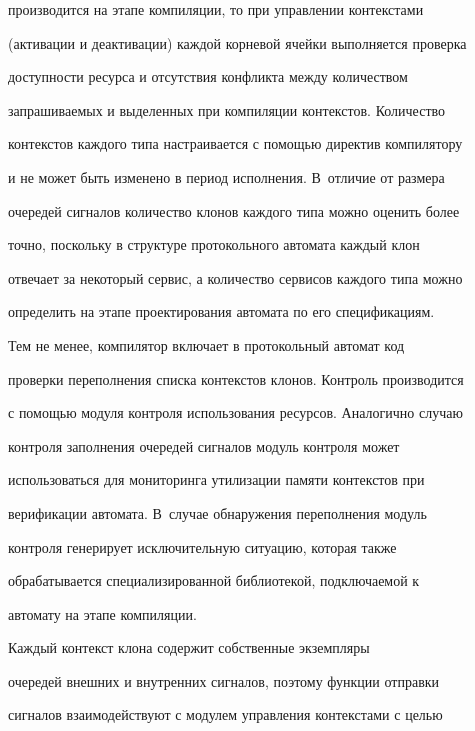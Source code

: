 производится на этапе компиляции, то при управлении контекстами 


(активации и деактивации) каждой корневой ячейки выполняется проверка 


доступности ресурса и отсутствия конфликта между количеством 


запрашиваемых и выделенных при компиляции контекстов. Количество 


контекстов каждого типа настраивается с помощью директив компилятору 


и не может быть изменено в период исполнения. В~отличие от размера 


очередей сигналов количество клонов каждого типа можно оценить более 


точно, поскольку в структуре протокольного автомата каждый клон 


отвечает за некоторый сервис, а количество сервисов каждого типа можно 


определить на этапе проектирования автомата по его спецификациям.


%      


      Тем не менее, компилятор включает в протокольный автомат код 


проверки переполнения списка контекстов клонов. Контроль производится 


с помощью модуля контроля использования ресурсов. Аналогично случаю 


контроля заполнения очередей сигналов модуль контроля может 


использоваться для мониторинга утилизации памяти контекстов при 


верификации автомата. В~случае обнаружения переполнения модуль 


контроля генерирует исключительную ситуацию, которая также 


обрабатывается специализированной библиотекой, подключаемой к 


автомату на этапе компиляции.


{





}


      


      Каждый контекст клона содержит собственные экземпляры 


очередей внешних и внутренних сигналов, поэтому функции отправки 


сигналов взаимодействуют с модулем управления контекстами с целью 


